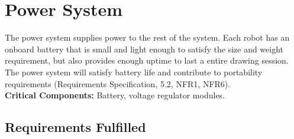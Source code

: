 
\section{Power System}
\label{sec:power_system}
The power system supplies power to the rest of the system. Each robot has an onboard battery that is small and light enough to satisfy the size and weight requirement, but also provides enough uptime to last a entire drawing session. The power system will satisfy battery life and contribute to portability requirements (Requirements Specification, 5.2, NFR1, NFR6). \\

\noindent
\textbf{Critical Components:} Battery, voltage regulator modules. 

\subsection{Requirements Fulfilled}